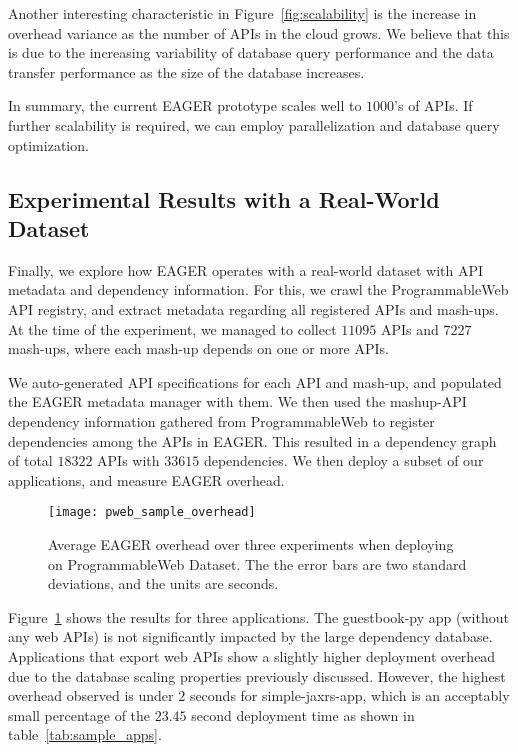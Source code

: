 Another interesting characteristic in Figure~\ref{fig:scalability} is the
increase in overhead variance as the number of APIs in the cloud
grows.  We believe that this is due to the increasing variability of database query
performance and the data transfer performance as the size of the database
increases.

In summary, the current EAGER prototype scales well to $1000$'s of APIs.
If further scalability is required, we can employ
parallelization and database query optimization.

\subsection{Experimental Results with a Real-World Dataset}

Finally, we explore how EAGER operates with a real-world dataset with API
metadata and dependency information. For this, we crawl the ProgrammableWeb
API registry, and extract metadata regarding all registered APIs and mash-ups.
At the time of the experiment, we managed to collect $11095$ APIs and $7227$ 
mash-ups, where each mash-up depends on one or more APIs.

We auto-generated API specifications for each API and mash-up, and 
populated the EAGER metadata manager with them. 
We then used the
mashup-API dependency information gathered from ProgrammableWeb
to register dependencies among the APIs in 
EAGER. This resulted in a dependency graph of total $18322$ APIs 
with $33615$ dependencies.  We then deploy a subset of our applications,
and measure EAGER overhead.

\begin{figure}
\centering
\texttt{[image: pweb\_sample\_overhead]}
\caption{Average EAGER overhead over three experiments when deploying on
ProgrammableWeb Dataset.  The the error bars are two standard deviations, and
the units are seconds.}
\label{fig:pweb_sample_overhead}
\end{figure}

Figure~\ref{fig:pweb_sample_overhead} shows the results for three applications. The guestbook-py app
(without any web APIs) is not significantly impacted by the large dependency database. 
Applications that export web APIs show a slightly higher deployment overhead
due to the database scaling properties previously discussed. 
However, the highest overhead observed is under $2$ seconds for
simple-jaxrs-app, which is an 
acceptably small percentage of the $23.45$ second deployment time as shown in
table~\ref{tab:sample_apps}.


